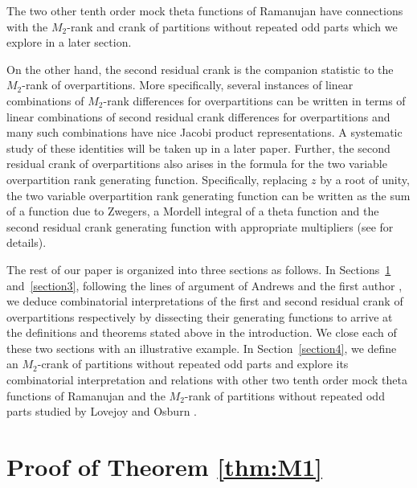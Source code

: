 \documentclass[pdftex]{sigma}
\numberwithin{equation}{section}
\newcommand\thm[1]{\ref{thm:#1}}
\begin{document}
The two other tenth order mock theta functions of Ramanujan have connections with the $M_2$-rank and crank of partitions without repeated odd parts which we explore in a later section.

On the other hand, the second residual crank is the companion statistic to the $M_2$-rank of overpartitions. More specifically, several instances of linear combinations of $M_2$-rank differences for overpartitions can be written in terms of linear combinations of second residual crank differences for overpartitions and many such combinations have nice Jacobi product representations. A systematic study of these identities will be taken up in a later paper. Further, the second residual crank of overpartitions also arises in the formula for the two variable overpartition rank generating function. Specifically, replacing $z$ by a root of unity, the two variable overpartition rank generating function can be written as the sum of a function due to Zwegers, a Mordell integral of a theta function and the second residual crank generating function with appropriate multipliers (see \cite[Corollary 2.2]{JS} for details).

The rest of our paper is organized into three sections as follows. In Sections~\ref{section2} and~\ref{section3}, following the lines of argument of Andrews and the first author \cite{An-Ga88}, we deduce combinatorial interpretations of the first and second residual crank of overpartitions respectively by dissecting their generating functions to arrive at the definitions and theorems stated above in the introduction. We close each of these two sections with an illustrative example. In Section~\ref{section4}, we define an $M_2$-crank of partitions without repeated odd parts and explore its combinatorial interpretation and relations with other two tenth order mock theta functions of Ramanujan and the $M_2$-rank of partitions without repeated odd parts studied by Lovejoy and Osburn \cite{Lo-Os09}.


\section{Proof of Theorem \thm{M1}}\label{section2}
\end{document}

